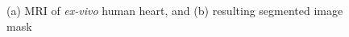 \begin{figure}[ht]
\centering
{}
%
\caption{(a) MRI of \textit{ex-vivo} human heart, and (b) resulting segmented image mask}
\label{fig:seg}
\end{figure}

